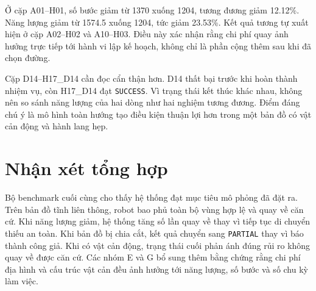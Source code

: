 \documentclass[../DoAn.tex]{subfiles}
\begin{document}
\begin{table}[H]
\centering
\caption{Kết quả nhóm H với mô hình toàn hướng lý tưởng}
\label{tab:omni_results}
\scriptsize
\setlength{\tabcolsep}{3.5pt}
\renewcommand{\arraystretch}{1.08}
\end{table}

Ở cặp A01--H01, số bước giảm từ 1370 xuống 1204, tương đương giảm 12.12\%. Năng lượng giảm từ 1574.5 xuống 1204, tức giảm 23.53\%. Kết quả tương tự xuất hiện ở cặp A02--H02 và A10--H03. Điều này xác nhận rằng chi phí quay ảnh hưởng trực tiếp tới hành vi lập kế hoạch, không chỉ là phần cộng thêm sau khi đã chọn đường.

Cặp D14--H17\_D14 cần đọc cẩn thận hơn. D14 thất bại trước khi hoàn thành nhiệm vụ, còn H17\_D14 đạt \texttt{SUCCESS}. Vì trạng thái kết thúc khác nhau, không nên so sánh năng lượng của hai dòng như hai nghiệm tương đương. Điểm đáng chú ý là mô hình toàn hướng tạo điều kiện thuận lợi hơn trong một bản đồ có vật cản động và hành lang hẹp.

\section{Nhận xét tổng hợp}

Bộ benchmark cuối cùng cho thấy hệ thống đạt mục tiêu mô phỏng đã đặt ra. Trên bản đồ tĩnh liên thông, robot bao phủ toàn bộ vùng hợp lệ và quay về căn cứ. Khi năng lượng giảm, hệ thống tăng số lần quay về thay vì tiếp tục di chuyển thiếu an toàn. Khi bản đồ bị chia cắt, kết quả chuyển sang \texttt{PARTIAL} thay vì báo thành công giả. Khi có vật cản động, trạng thái cuối phản ánh đúng rủi ro không quay về được căn cứ. Các nhóm E và G bổ sung thêm bằng chứng rằng chi phí địa hình và cấu trúc vật cản đều ảnh hưởng tới năng lượng, số bước và số chu kỳ làm việc.
\end{document}
